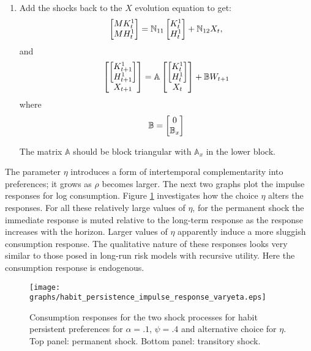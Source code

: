\documentclass[12pt]{article}
\begin{document}
\begin{enumerate}
\item Add the shocks back to the $X$ evolution equation to get:
\[
 \begin{bmatrix} MK_t^1 \cr MH_t^1 \end{bmatrix} = {\mathbb N}_{11} \begin{bmatrix} K_{t}^1 \cr H_{t}^1 \end{bmatrix}
 + {\mathbb N}_{12} X_t,
\]
and
\begin{equation}  \label{endogenous_dynamics}
\begin{bmatrix} \begin{bmatrix}  K_{t+1}^1 \cr H_{t+1}^1 \end{bmatrix}  \cr X_{t+1} \end{bmatrix}
= {\mathbb A} \begin{bmatrix} \begin{bmatrix}  K_{t}^1 \cr H_{t}^1 \end{bmatrix}  \cr X_{t} \end{bmatrix} + {\mathbb B}
W_{t+1}
\end{equation}
where
\[
 {\mathbb B} = \begin{bmatrix} 0 \cr {\mathbb B}_x \end{bmatrix}
\]

The matrix ${\mathbb A}$ should be block triangular with ${\mathbb A}_x$ in the lower block.
\end{enumerate}


The parameter $\eta$ introduces a form of intertemporal complementarity into preferences; it grows as $\rho$ becomes
larger.  The next two graphs plot the impulse responses for log consumption.  Figure \ref{fig:rho_responses} investigates how the choice $\eta$ alters the responses.  For all these relatively large values of $\eta$,  for the permanent shock the immediate response is muted relative to the long-term response as the response increases with the horizon.  Larger values of $\eta$ apparently induce  a more sluggish consumption response.  The qualitative nature of these responses looks very similar to those posed in long-run risk models with recursive utility.  Here the consumption response is endogenous.


\begin{figure}[H]
\texttt{[image: graphs/habit\_persistence\_impulse\_response\_varyeta.eps]}
\caption{Consumption responses for the two shock processes for habit persistent preferences for $\alpha = .1$, $\psi = .4$ and alternative choice for $\eta$. Top panel: permanent shock.  Bottom panel: transitory shock.  \label{fig:rho_responses}}
\end{figure}
\end{document}
